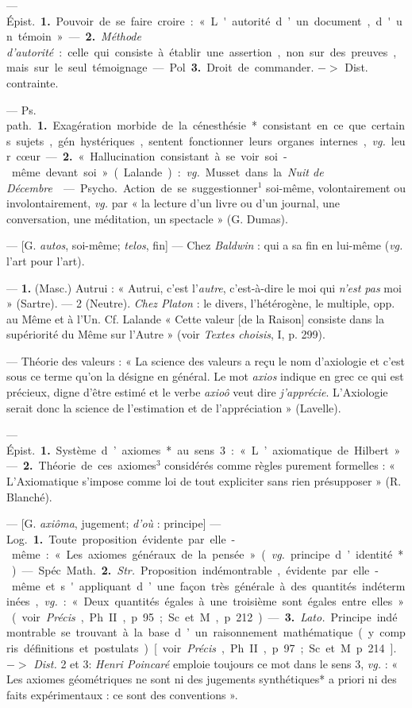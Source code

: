 \begin{itemize}[leftmargin=1cm, label=, itemsep=1pt]
 — \si{Épist.} {\bf 1.} Pouvoir de se
faire croire : « L'autorité d’un document, d'un témoin ». — {\bf 2.} {\it Méthode
d'autorité} : celle qui consiste à établir
une assertion, non sur des preuves,
mais sur le seul témoignage.

— Pol. {\bf 3.} Droit de commander.
$->$ Dist. contrainte.

 — \si{Ps. path.} {\bf 1.} Exagération morbide de
la cénesthésie* consistant en ce que certains sujets, gén.
hystériques, sentent fonctionner
leurs organes internes, {\it vg.} leur
cœur. — {\bf 2.} « Hallucination consistant à se voir soi-même devant soi »
(Lalande) : {\it vg.} Musset dans la {\it Nuit
de Décembre}.

 — \si{Psycho.} Action
de se suggestionner$^1$ soi-même, volontairement ou involontairement,
{\it vg.} par « la lecture d’un livre ou
d’un journal, une conversation, une
méditation, un spectacle » (G.
Dumas).

 — [G. {\it autos}, soi-même; {\it telos},
fin] — Chez {\it Baldwin} : qui a sa fin
en lui-même ({\it vg.} l’art pour l’art).

 — {\bf 1.} (Masc.) Autrui :
« Autrui, c’est l’{\it autre}, c’est-à-dire
le moi qui {\it n’est pas} moi » (Sartre). —
2 (Neutre). {\it Chez Platon} : le divers,
l’hétérogène, le multiple, opp. au
Même et à l’Un. Cf. Lalande
« Cette valeur [de la Raison] consiste
dans la supériorité du Même sur
l'Autre » (voir {\it Textes choisis}, I,
p. 299).

 — Théorie des valeurs : « La
science des valeurs a reçu le nom
d’axiologie et c'est sous ce terme
qu’on la désigne en général. Le mot
{\it axios} indique en grec ce qui est précieux, digne d'être estimé et le
verbe {\it axioô} veut dire {\it j'apprécie}.
L’Axiologie serait donc la science
de l’estimation et de l’appréciation »
(Lavelle).

 — \si{Épist.} {\bf 1.} Système
d’axiomes* au sens 3 : « L’axiomatique de Hilbert ». — {\bf 2.} Théorie de
ces axiomes$^3$ considérés comme
règles purement formelles : « L’Axiomatique s'impose comme loi de tout
expliciter sans rien présupposer »
(R. Blanché).

 — [G. {\it axiôma}, jugement; {\it d'où} :
principe] — \si{Log.} {\bf 1.} Toute proposition évidente par elle-même : « Les
axiomes généraux de la pensée » ({\it vg.}
principe d’identité*).

— Spéc. \si{Math.} {\bf 2.} {\it Str.} Proposition indémontrable, évidente par
elle-même et s'appliquant d’une
façon très générale à des quantités
indéterminées, {\it vg.} : « Deux quantités
égales à une troisième sont égales
entre elles » (voir {\it Précis}, Ph. II,
p. 95; Sc. et M., p. 212). — {\bf 3.} {\it Lato.}
Principe indémontrable se trouvant
à la base d’un raisonnement mathématique (y compris définitions et
postulats) [voir {\it Précis}, Ph. II, p. 97;
Sc. et M. p. 214]. $->$ {\it Dist.} 2 et 3:
{\it Henri Poincaré} emploie toujours
ce mot dans le sens 3, {\it vg.} : « Les
axiomes géométriques ne sont ni des
jugements synthétiques* a priori ni
des faits expérimentaux : ce sont
des conventions ».
	\end{itemize}
